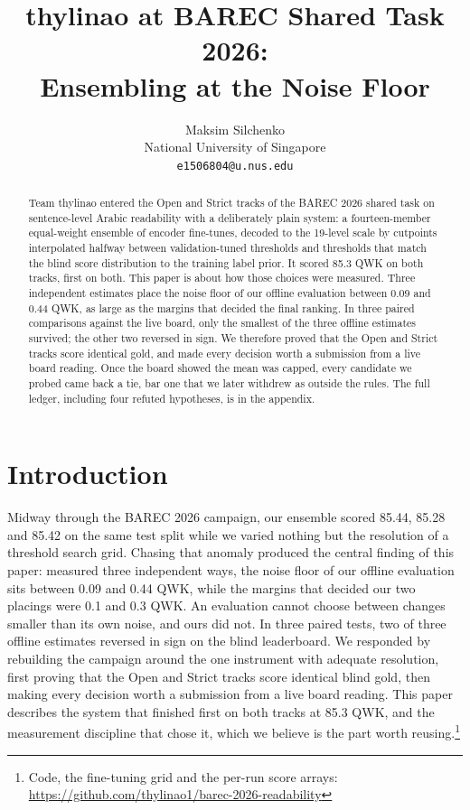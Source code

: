 \documentclass[11pt]{article}
\title{thylinao at BAREC Shared Task 2026:\\Ensembling at the Noise Floor}
\author{Maksim Silchenko \\
  National University of Singapore \\
  \texttt{e1506804@u.nus.edu}}
\begin{document}
\maketitle

\begin{abstract}
Team thylinao entered the Open and Strict tracks of the BAREC 2026 shared task on
sentence-level Arabic readability with a deliberately plain system: a fourteen-member equal-weight ensemble of
encoder fine-tunes, decoded to the 19-level scale by cutpoints interpolated halfway between
validation-tuned thresholds and thresholds that match the blind score distribution to the
training label prior. It scored 85.3 QWK on both tracks, first on both. This paper is about
how those choices were measured. Three independent estimates place the noise floor of our
offline evaluation between 0.09 and 0.44 QWK, as large as the margins that decided the final
ranking. In three paired comparisons against the live board, only the smallest of the three
offline estimates survived; the other two reversed in sign. We therefore proved that the Open
and Strict tracks score identical gold, and made every decision worth a submission from a live
board reading. Once the board showed the mean was capped, every candidate we probed came back a
tie, bar one that we later withdrew as outside the rules. The full ledger, including four
refuted hypotheses, is in the appendix.
\end{abstract}

\section{Introduction}

Midway through the BAREC 2026 campaign, our ensemble scored 85.44, 85.28 and 85.42 on the
same test split while we varied nothing but the resolution of a threshold search grid.
Chasing that anomaly produced the central finding of this paper: measured three independent
ways, the noise floor of our offline evaluation sits between 0.09 and 0.44 QWK, while the
margins that decided our two placings were 0.1 and 0.3 QWK. An evaluation cannot choose between
changes smaller than its own noise, and ours did not. In three paired tests, two of three
offline estimates reversed in sign on the blind leaderboard. We
responded by rebuilding the campaign around the one instrument with adequate resolution,
first proving that the Open and Strict tracks score identical blind gold, then making every
decision worth a submission from a live board reading. This paper describes the system that
finished first on both tracks at 85.3 QWK, and the measurement discipline that chose it,
which we believe is the part worth reusing.\footnote{Code, the fine-tuning grid and the
per-run score arrays: \url{https://github.com/thylinao1/barec-2026-readability}}
\end{document}
